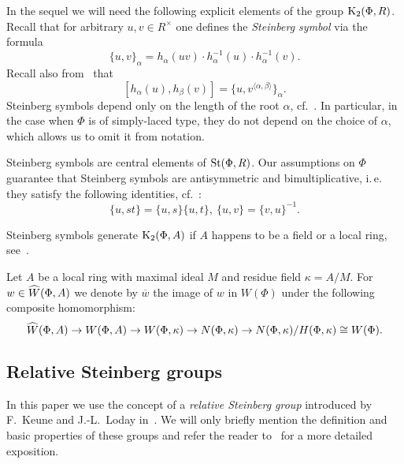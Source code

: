 In the sequel we will need the following explicit elements of the group $\operatorname{K}_2(\Phi, R)$.
Recall that for arbitrary $u, v \in R^\times$ one defines the \textit{Steinberg symbol} via the formula
\begin{equation} \label{eq:steinberg} \{ u, v \}_\alpha = h_\alpha(uv) \cdot h_\alpha^{-1}(u) \cdot h_\alpha^{-1}(v). \end{equation}
Recall also from~\cite[Lemme~5.4]{Ma69} that
\begin{equation} \label{eq:steinberg-2} [h_\alpha(u), h_\beta(v)] = \{u, v^{\langle \alpha, \beta \rangle}\}_\alpha. \end{equation}
Steinberg symbols depend only on the length of the root $\alpha$, cf.~\cite[pp.~26--28]{Ma69}.
In particular, in the case when $\Phi$ is of simply-laced type, they do not depend on the choice of $\alpha$, which allows us to omit it from notation.

Steinberg symbols are central elements of $\operatorname{St}(\Phi, R)$.
Our assumptions on $\Phi$ guarantee that Steinberg symbols are antisymmetric and bimultiplicative, i.\,e. they satisfy the following identities, cf.~\cite[Lemme~2.4]{Ma69}:
\begin{equation} \label{eq:symbol-properties} \{ u, st \} = \{ u, s\} \{ u, t \}, \ \{ u, v \} = \{ v, u\}^{-1}. \end{equation}

Steinberg symbols generate $\operatorname{K}_2(\Phi, A)$ if $A$ happens to be a field or a local ring, see~\cite[Theorem~2.13]{Ste73}.

Let $A$ be a local ring with maximal ideal $M$ and residue field $\kappa = A/M$.
For $w \in \widehat{W}(\Phi, A)$ we denote by $\overline{w}$ the image of $w$ in $W(\Phi)$ under the following composite homomorphism:
\[ \widehat{W}(\Phi, A) \to W(\Phi, A) \to W(\Phi, \kappa) \to N(\Phi, \kappa) \to N(\Phi, \kappa) / H(\Phi, \kappa) \cong W(\Phi). \]

\subsection{Relative Steinberg groups} \label{subsec:another-presentation}
In this paper we use the concept of a \textit{relative Steinberg group} introduced by F.~Keune and J.-L.~Loday in~\cite{Ke78, Lo78}.
We will only briefly mention the definition and basic properties of these groups and refer the reader to~\cite[\S~2.3]{LS20} for a more detailed exposition.

